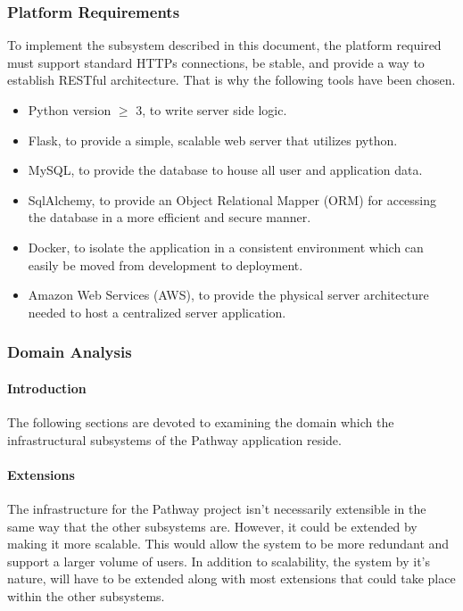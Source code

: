 ﻿\documentclass{article}
\begin{document}
\subsubsection{Platform Requirements}
To implement the subsystem described in this document, the platform required must support standard HTTPs connections, be stable, and provide a
way to establish RESTful architecture. That is why the following tools have been chosen.

\begin{itemize}
    \item Python version $\geq$ 3, to write server side logic.
    \item Flask, to provide a simple, scalable web server that utilizes python.
    \item MySQL, to provide the database to house all user and application data.
    \item SqlAlchemy, to provide an Object Relational Mapper (ORM) for accessing the database in a more efficient and secure manner.
    \item Docker, to isolate the application in a consistent environment which can easily be moved from development to deployment.
    \item Amazon Web Services (AWS), to provide the physical server architecture needed to host a centralized server application. 
\end{itemize}

\subsubsection{Domain Analysis}

\paragraph{Introduction}
The following sections are devoted to examining the domain which the infrastructural subsystems of the Pathway application reside.

\paragraph{Extensions}
The infrastructure for the Pathway project isn't necessarily extensible in the same way that the other subsystems are. 
However, it could be extended by making it more scalable. This would allow the system to be
more redundant and support a larger volume of users. In addition to scalability, the system by it's nature, will have to be extended 
along with most extensions that could take place within the other subsystems. 
\end{document}
